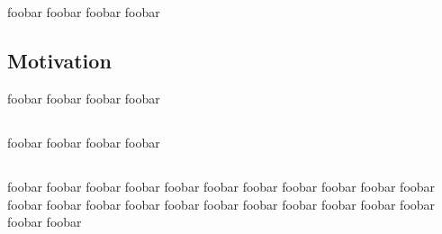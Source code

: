 \section{\preamble}
\label{cha:preamble}
foobar foobar foobar foobar
\subsection{Motivation}
\label{sec:motivation}
foobar foobar foobar foobar
\subsection{\target}
\label{sec:target}
foobar foobar foobar foobar
\subsection{\structure}
\label{sec:structure}
foobar foobar foobar foobar foobar foobar foobar foobar
foobar foobar foobar foobar foobar foobar foobar foobar
foobar foobar foobar foobar foobar foobar foobar foobar
